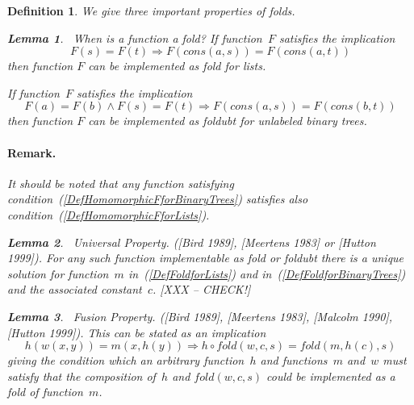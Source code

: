 \documentclass[11pt]{article} %
\newtheorem{lemma}{Lemma}
\newcommand{\eqn}[1]{(\ref{#1})}
\newcommand{\eeq}{\end{equation}}
\newcommand{\beql}[1]{\begin{equation}\label{#1}}
\newcommand{\FoldFunSET}{{\mathbb F}}
\newcommand{\SexprSET}{{\mathbb S}}
\newcommand{\FoldRangeSET}{{\mathbb T}}
\newtheorem{definition}[theorem]{Definition}
\newcommand{\sexpr}{\ensuremath{\textit{S-expression}}\xspace}
\newcommand{\funapply}{\ensuremath{\circ}}
\begin{document}
\begin{definition}
We give three important properties of folds.


\begin{lemma}~\label{When_is_a_function_a_fold}
When is a function a fold?
If function~$F$ satisfies the implication
\beql{DefHomomorphicFforLists}
    F(s) = F(t) \Rightarrow F(cons(a, s)) = F(cons(a, t))
\eeq
then function $F$ can be implemented as {\em fold} for {\em lists}.

If function~$F$ satisfies the implication
\beql{DefHomomorphicFforBinaryTrees}
    F(a) = F(b) \wedge F(s) = F(t) \Rightarrow F(cons(a, s)) = F(cons(b, t))
\eeq
then function $F$ can be implemented as {\em foldubt} for {\em unlabeled binary trees}.
\end{lemma}
\paragraph{Remark.}
It should be noted that
any function satisfying
condition~\eqn{DefHomomorphicFforBinaryTrees} satisfies also condition~\eqn{DefHomomorphicFforLists}.


\begin{lemma}~\label{Universal_Property}
Universal Property.
\normalfont
([Bird 1989], [Meertens 1983] or [Hutton 1999]).
For any such function implementable as {\em fold} or {\em foldubt}
there is a unique solution for function~$m$ in~\eqn{DefFoldforLists}
and in~\eqn{DefFoldforBinaryTrees} and the associated constant~$c$. [XXX -- CHECK!]
\end{lemma}

\begin{lemma}~\label{Fusion_Property}
Fusion Property.
\normalfont
([Bird 1989], [Meertens 1983], [Malcolm 1990], [Hutton 1999]).
This can be stated as an implication
\beql{DefFusionPropertyFold}
    h(w(x,y)) = m(x,h(y)) \Rightarrow h \funapply fold(w,c,s) = fold(m,h(c),s)
\eeq
giving the condition which an arbitrary function~$h$ and functions~$m$ and~$w$
must satisfy that the composition of~$h$ and $fold(w,c,s)$
could be implemented as a fold of function~$m$.
\end{lemma}

\end{definition}
\end{document}
